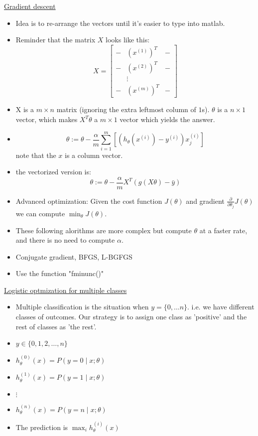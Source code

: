 \documentclass[12pt]{article}
\begin{document}
\underline{Gradient descent}
\begin{itemize}
	\item Idea is to re-arrange the vectors until it's easier to type into matlab.
	\item Reminder that the matrix $X$ looks like this: 
	$$X =
	\left[
	\begin{array}{ccc}
	-& (x^{(1)})^T & - \\
	- & (x^{(2)})^T & - \\
	& \vdots    &          \\
	- & (x^{(m)})^T & -
	\end{array}
	\right]
	$$
	\item X is a $m\times n$ matrix (ignoring the extra leftmost column of $1$s). $\theta$ is a $n\times1$ vector, which makes $X^T\theta$ a $m\times1$ vector which yields the answer.
	\item \[ \theta:= \theta -\frac{\alpha}{m} \sum_{i=1}^{m} [(h_\theta(x^{(i)})-y^{(i)})x^{(i)}_j]\] note that the $x$ is a column vector.
	\item the vectorized version is: \[\theta:=\theta - \frac{\alpha}{m}X^T(g(X\theta)-\bar{y})\]
	\item Advanced optimization: Given the cost function $J(\theta)$ and gradient $\frac{\partial}{\partial\theta_j}J(\theta)$ we can compute $\min_\theta J(\theta)$. 
	\item These following alorithms are more complex but compute $\theta$ at a faster rate, and there is no need to compute $\alpha$. 
	\item Conjugate gradient, BFGS, L-BGFGS
	\item Use the function "fminunc()"
	
\end{itemize}

\underline{Logistic optmization for multiple classes}
\begin{itemize}
	\item Multiple classification is the situation when $y=\{0,\ldots n\}$. i.e. we have different classes of outcomes. Our strategy is to assign one class as 'positive' and the rest of classes as 'the rest'.
	\item $y\in\{0,1,2,\ldots,n\}$
	\item $h_\theta^{(0)}(x) = P(y=0\mid x;\theta)$
		\item $h_\theta^{(1)}(x) = P(y=1\mid x;\theta)$
		\item $\vdots$
			\item $h_\theta^{(n)}(x) = P(y=n\mid x;\theta)$
	\item The prediction is $\max_i h_\theta^{(i)}(x)$
\end{itemize}
\end{document}
